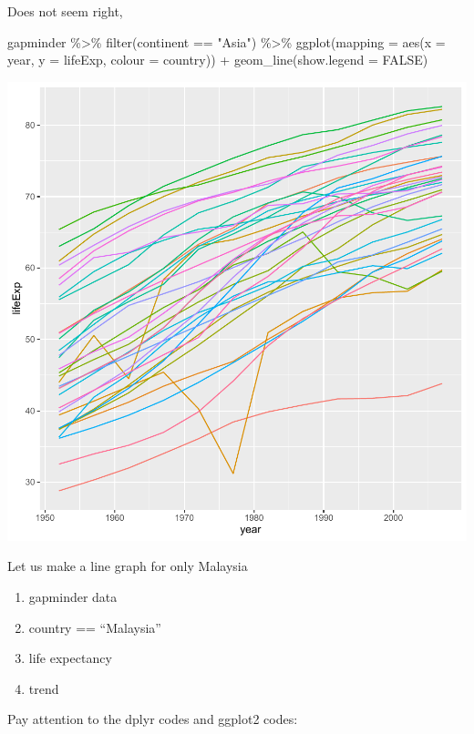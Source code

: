 \documentclass[
]{book}
\makeatletter
\newenvironment{Shaded}{\begin{snugshade}}{\end{snugshade}}
\newcommand{\AttributeTok}[1]{\textcolor[rgb]{0.61,0.61,0.61}{#1}}
\newcommand{\ConstantTok}[1]{\textcolor[rgb]{0,0,0}{#1}}
\newcommand{\FunctionTok}[1]{\textcolor[rgb]{0,0,0}{#1}}
\newcommand{\NormalTok}[1]{#1}
\newcommand{\SpecialCharTok}[1]{\textcolor[rgb]{0,0,0}{#1}}
\newcommand{\StringTok}[1]{\textcolor[rgb]{0.5,0.5,0.5}{#1}}
\providecommand{\tightlist}{%
  \setlength{\itemsep}{0pt}\setlength{\parskip}{0pt}}
\newenvironment{kframe}{%
\medskip{}
\setlength{\fboxsep}{.8em}
 \def\at@end@of@kframe{}%
 \ifinner\ifhmode%
  \def\at@end@of@kframe{\end{minipage}}%
  \begin{minipage}{\columnwidth}%
 \fi\fi%
 \def\FrameCommand##1{\hskip\@totalleftmargin \hskip-\fboxsep
 \colorbox{shadecolor}{##1}\hskip-\fboxsep
     \hskip-\linewidth \hskip-\@totalleftmargin \hskip\columnwidth}%
 \MakeFramed {\advance\hsize-\width
   \@totalleftmargin\z@ \linewidth\hsize
   \@setminipage}}%
 {\par\unskip\endMakeFramed%
 \at@end@of@kframe}
\renewenvironment{Shaded}{\begin{kframe}}{\end{kframe}}
\makeatother
\begin{document}
Does not seem right,

\begin{Shaded}
\begin{Highlighting}[]
\NormalTok{gapminder }\SpecialCharTok{\%\textgreater{}\%} \FunctionTok{filter}\NormalTok{(continent }\SpecialCharTok{==} \StringTok{"Asia"}\NormalTok{) }\SpecialCharTok{\%\textgreater{}\%}
\FunctionTok{ggplot}\NormalTok{(}\AttributeTok{mapping =} \FunctionTok{aes}\NormalTok{(}\AttributeTok{x =}\NormalTok{ year, }\AttributeTok{y =}\NormalTok{ lifeExp, }\AttributeTok{colour =}\NormalTok{ country)) }\SpecialCharTok{+}
  \FunctionTok{geom\_line}\NormalTok{(}\AttributeTok{show.legend =} \ConstantTok{FALSE}\NormalTok{)}
\end{Highlighting}
\end{Shaded}

\begin{center}\includegraphics[width=0.7\linewidth,keepaspectratio]{Multivariable_Data_Analysis_files/figure-latex/unnamed-chunk-90-1} \end{center}

Let us make a line graph for only Malaysia

\begin{enumerate}
\def\labelenumi{\arabic{enumi}.}
\tightlist
\item
  gapminder data
\item
  country == ``Malaysia''
\item
  life expectancy
\item
  trend
\end{enumerate}

Pay attention to the dplyr codes and ggplot2 codes:
\end{document}
